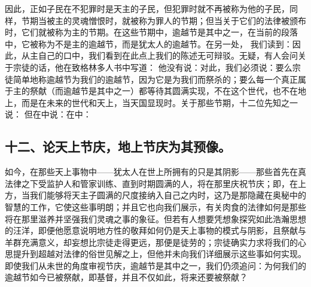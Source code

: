 因此，正如子民在不犯罪时是天主的子民，但犯罪时就不再被称为他的子民，同样，节期当被主的灵魂憎恨时，就被称为罪人的节期；但当关于它们的法律被颁布时，它们就被称为主的节期。在这些节期中，逾越节是其中之一，在当前的段落中，它被称为不是主的逾越节，而是犹太人的逾越节。在另一处， 我们读到：因此，从主自己的口中，我们看到在此点上我们的陈述无可辩驳。无疑，有人会问关于宗徒的话，他在致格林多人书中写道： 他没有说：对此，我们必须说：要么宗徒简单地称逾越节为我们的逾越节，因为它是为我们而祭杀的；要么每一个真正属于主的祭献（而逾越节是其中之一）都等待其圆满实现，不在这个世代，也不在地上，而是在未来的世代和天上，当天国显现时。关于那些节期，十二位先知之一说： 但在中说：在中：\par


\subsection{十二、论天上节庆，地上节庆为其预像。}

如今，在那些天上事物中——犹太人在世上所拥有的只是其阴影——那些首先在真法律之下受监护人和管家训练、直到时期圆满的人，将在那里庆祝节庆；即，在上方，当我们能够将天主子圆满的尺度接纳入自己之内时，这乃是那隐藏在奥秘中的智慧的工作，它使这些事明朗；并且它也向我们展示，有关肉食的法律如何是那些将在那里滋养并坚强我们灵魂之事的象征。但若有人想要凭想象探究如此浩瀚思想的汪洋，即便他愿意说明地方性的敬拜如何仍是天上事物的模式与阴影，且祭献与羊群充满意义，却妄想比宗徒走得更远，那便是徒劳的；宗徒确实力求将我们的心思提升到超越对法律的俗世见解之上，但他并未向我们详细展示这些事如何实现。即使我们从未世的角度审视节庆，逾越节是其中之一，我们仍须追问：为何我们的逾越节如今已被祭献，即基督，并且不仅如此，将来还要被祭献？\par


